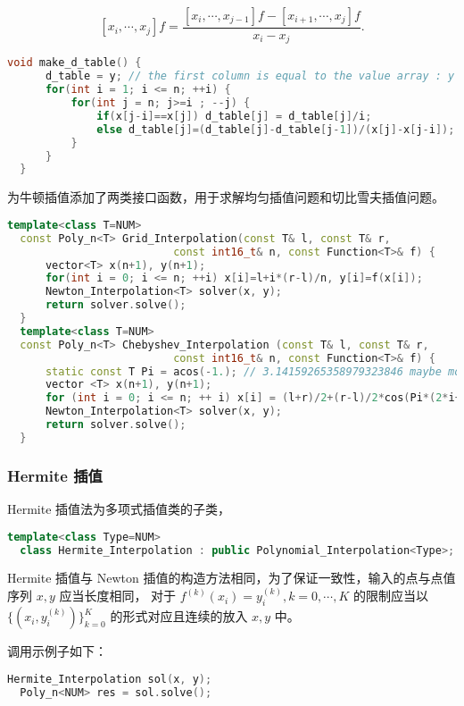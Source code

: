 \documentclass[lang=cn,a4paper,newtx,bibend=bibtex]{elegantpaper}
\begin{document}
\[
  [x_i, \cdots, x_j] f = \dfrac{[x_i, \cdots, x_{j-1}]f
  - [x_{i+1}, \cdots, x_j]f}{x_i - x_j}.
\]

\begin{lstlisting}[language=C++]
  void make_d_table() {
      d_table = y; // the first column is equal to the value array : y
      for(int i = 1; i <= n; ++i) {
          for(int j = n; j>=i ; --j) {
              if(x[j-i]==x[j]) d_table[j] = d_table[j]/i;
              else d_table[j]=(d_table[j]-d_table[j-1])/(x[j]-x[j-i]);
          }
      }
  }
\end{lstlisting}

为牛顿插值添加了两类接口函数，用于求解均匀插值问题和切比雪夫插值问题。

\begin{lstlisting}[language=C++]
  template<class T=NUM>
  const Poly_n<T> Grid_Interpolation(const T& l, const T& r, 
                          const int16_t& n, const Function<T>& f) {
      vector<T> x(n+1), y(n+1);
      for(int i = 0; i <= n; ++i) x[i]=l+i*(r-l)/n, y[i]=f(x[i]);
      Newton_Interpolation<T> solver(x, y);
      return solver.solve();
  }
  template<class T=NUM>
  const Poly_n<T> Chebyshev_Interpolation (const T& l, const T& r, 
                          const int16_t& n, const Function<T>& f) {
      static const T Pi = acos(-1.); // 3.14159265358979323846 maybe more precise
      vector <T> x(n+1), y(n+1);
      for (int i = 0; i <= n; ++ i) x[i] = (l+r)/2+(r-l)/2*cos(Pi*(2*i+1)/(2*n+2)), y[i] = f(x[i]);
      Newton_Interpolation<T> solver(x, y);
      return solver.solve();
  }
\end{lstlisting}

\subsubsection{Hermite 插值}

Hermite 插值法为多项式插值类的子类，
\begin{lstlisting}[language=C++]
  template<class Type=NUM>
  class Hermite_Interpolation : public Polynomial_Interpolation<Type>;
\end{lstlisting}

Hermite 插值与 Newton 插值的构造方法相同，为了保证一致性，输入的点与点值序列 $x, y$ 应当长度相同，
对于 $f^(k)(x_i) = y_i^{(k)}, k=0, \cdots, K$ 的限制应当以 $\{(x_i, y_i^{(k)})\}_{k=0}^K$ 的形式对应且连续的放入 $x, y$ 中。

调用示例子如下：
\begin{lstlisting}[language=C++]
  Hermite_Interpolation sol(x, y);
  Poly_n<NUM> res = sol.solve();
\end{lstlisting}
\end{document}
